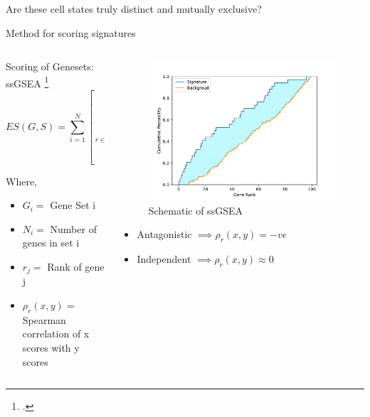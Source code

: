 \documentclass[aspectratio=169,9pt]{beamer}
\begin{document}
    \begin{frame}[standout]
        Are these cell states truly distinct and mutually exclusive?
    \end{frame}


    \begin{frame}{Method for scoring signatures}
    \begin{columns}
    \begin{column}{0.55\textwidth}
        Scoring of Genesets: ssGSEA \footcite{ssGSEA}
        $$ES(G,S) = \sum_{i=1}^N \left[ \underbrace{\sum_{r\in G, j\le i}\frac{|r_j|^{(1/4)}}{\sum_{r_j\in G}|r_j|^{(1/4)}}}_{\text{ECDF of genes in signature}} - \underbrace{\sum_{r\notin G, j\le i} \frac{1}{N - N_G}}_{\text{ECDF of background genes}}\right]$$
        {\scriptsize Where,
        \begin{itemize}
            \item $G_i =$ Gene Set i
            \item $N_i =$ Number of genes in set i
            \item $r_j =$ Rank of gene j
            \item $\rho_r(x,y) =$ Spearman correlation of x scores with y scores
        \end{itemize}}
    \end{column}
    \begin{column}{0.45\textwidth}
        \begin{figure}
            \centering
            \includegraphics[width=\textwidth]{ecdf}
            \caption{Schematic of ssGSEA}
        \end{figure}
        \pause
        \begin{itemize}
            \item Antagonistic $\implies \rho_r(x,y) = -ve $
            \item Independent $\implies \rho_r(x,y) \approx 0 $
        \end{itemize}
    \end{column}
    \end{columns}
    \end{frame}
\end{document}
